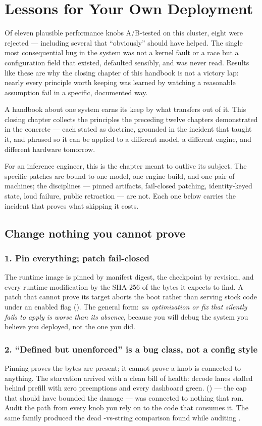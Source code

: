 \chapter{Lessons for Your Own Deployment}
\label{ch:lessons}

Of eleven plausible performance knobs A/B-tested on this cluster, eight were
rejected --- including several that ``obviously'' should have helped. The
single most consequential bug in the system was not a kernel fault or a
race but a configuration field that existed, defaulted sensibly, and was
never read. Results like these are why the closing chapter of this handbook
is not a victory lap: nearly every principle worth keeping was learned by
watching a reasonable assumption fail in a specific, documented way.

A handbook about one system earns its keep by what transfers out of it. This
closing chapter collects the principles the preceding twelve chapters
demonstrated in the concrete --- each stated as doctrine, grounded in the
incident that taught it, and phrased so it can be applied to a different
model, a different engine, and different hardware tomorrow.

For an inference engineer, this is the chapter meant to outlive its subject.
The specific patches are bound to one model, one engine build, and one pair
of machines; the disciplines --- pinned artifacts, fail-closed patching,
identity-keyed state, loud failure, public retraction --- are not. Each
one below carries the incident that proves what skipping it costs.

\section{Change nothing you cannot prove}

\subsection*{1. Pin everything; patch fail-closed}
The runtime image is pinned by manifest digest, the checkpoint by revision,
and every runtime modification by the SHA-256 of the bytes it expects to
find. A patch that cannot prove its target aborts the boot rather than
serving stock code under an enabled flag (). The general
form: \emph{an optimization or fix that silently fails to apply is worse
than its absence}, because you will debug the system you believe you
deployed, not the one you did.

\subsection*{2. ``Defined but unenforced'' is a bug class, not a config style}
Pinning proves the bytes are present; it cannot prove a knob is connected
to anything. The starvation arrived with a clean bill of health: decode
lanes stalled behind prefill with zero preemptions and every dashboard
green.  () --- the cap that
should have bounded the damage --- was connected to nothing that ran. Audit the path
from every knob you rely on to the code that consumes it. The same family
produced the dead -vs-string comparison found while auditing
.

